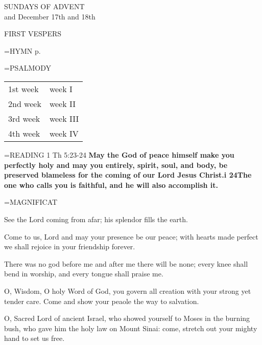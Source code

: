 \begin{center}\normalsize SUNDAYS OF ADVENT\\
\footnotesize and December 17th and 18th\\
\end{center}

\begin{flushleft}\normalsize FIRST VESPERS\\\end{flushleft}

\hangindent=\parindent \small{\uppercase{HYMN} p.  \pageref{advent:firstHymn}\\}

\hangindent=\parindent \small{PSALMODY}
\begin{center}
\begin{tabular}{ l l }
1st week &     week I\\
2nd week &     week II\\
3rd week &     week III\\
4th week &     week IV\\
\end{tabular}
\end{center}		

\hangindent=\parindent \small{READING} 1 Th 5:23-24 \textbf{ May the God of peace himself make you perfectly holy and may you entirely, spirit, soul, and body, be preserved blameless for the coming of our Lord Jesus Christ.i 24The one who calls you is faithful, and he will also accomplish it.\\}

\hangindent=\parindent \small MAGNIFICAT
\begin{description}[labelindent=\parindent, noitemsep, leftmargin=*]
\item [Week 1:]  See the Lord coming from afar; his splendor fills the earth.
\item [Week 2:]  Come to us, Lord and may your presence be our peace; with hearts made perfect we shall rejoice in your friendship forever.
\item [Week 3:]  There was no god before me and after me there will be none; every knee shall bend in worship, and every tongue shall praise me.
\item [(December 17th):]  O, Wisdom, O holy Word of God, you govern all creation with your strong yet tender care. Come and show your peaole the way to salvation.
\item [(December 18th):]  O, Sacred Lord of ancient Israel, who showed yourself to Moses in the burning bush, who gave him the holy law on Mount Sinai: come, stretch out your mighty hand to set us free.
\end{description}

